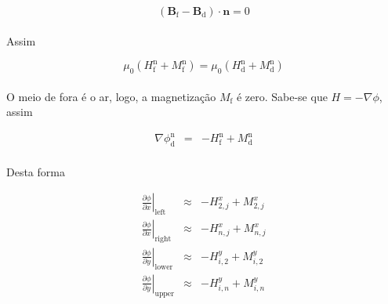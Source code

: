 \documentclass[eletromagnetismo.tex]{subfiles}
\begin{document}
\begin{equation}
\left(\mathbf{B}_{\mathrm{f}} - \mathbf{B}_{\mathrm{d}}\right)\cdot \mathbf{n} = 0
\end{equation}

\paragraph{} Assim

\begin{equation}
\mu_0 (H_{\mathrm{f}}^{\mathrm{n}} + M_{\mathrm{f}}^{\mathrm{n}}) =  \mu_0(H_{\mathrm{d}}^{\mathrm{n}}+M_{\mathrm{d}}^{\mathrm{n}})
\end{equation}

\paragraph{} O meio de fora é o ar, logo, a magnetização $M_{\mathrm{f}}$ é zero. Sabe-se que $H = -\nabla\phi$, assim

\begin{eqnarray}
\nabla\phi_{\mathrm{d}}^{\mathrm{n}} & = & -H_{\mathrm{f}}^{\mathrm{n}} + M_{\mathrm{d}}^{\mathrm{n}}
\end{eqnarray}

\paragraph{} Desta forma

\begin{eqnarray}
\left.\frac{\partial \phi}{\partial x}\right|_{\mathrm{left}}\;\;&\approx&- H^{x}_{2,j} + M^{x}_{2,j}\\
\left.\frac{\partial \phi}{\partial x}\right|_{\mathrm{right}}&\approx&- H^{x}_{n,j} + M^{x}_{n,j}\\
\left.\frac{\partial \phi}{\partial y}\right|_{\mathrm{lower}}&\approx&- H^{y}_{i,2} + M^{y}_{i,2}\\
\left.\frac{\partial \phi}{\partial y}\right|_{\mathrm{upper}}&\approx&- H^{y}_{i,n} + M^{y}_{i,n}
\end{eqnarray}
\end{document}
